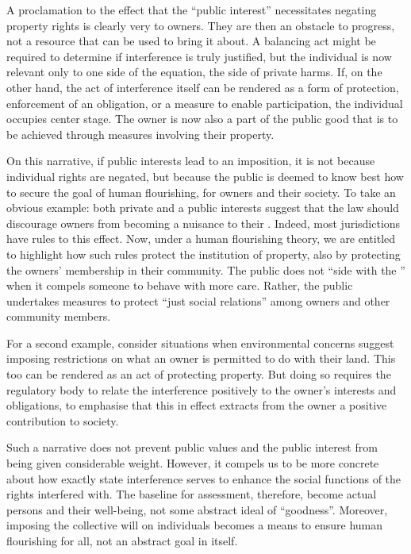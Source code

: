{A proclamation to the effect that the ``public interest'' necessitates negating property rights is clearly very  to owners. They are then an obstacle to progress, not a resource that can be used to bring it about. A balancing act might be required to determine if interference is truly justified, but the individual is now relevant only to one side of the equation, the side of private harms. If, on the other hand, the act of interference itself can be rendered as a form of protection, enforcement of an obligation, or a measure to enable participation, the individual occupies center stage. The owner is now also a part of the public good that is to be achieved through measures involving their property.

On this narrative, if public interests lead to an imposition, it is not because individual rights are negated, but because the public is deemed to know best how to secure the goal of human flourishing, for owners and their society. To take an obvious example: both private and a public interests suggest that the law should discourage owners from becoming a nuisance to their . Indeed, most jurisdictions have rules to this effect. Now, under a human flourishing theory, we are entitled to highlight how such rules protect the institution of property, also by protecting the owners' membership in their community. The public does not ``side with the '' when it compels someone to behave with more care. Rather, the public undertakes measures to protect ``just social relations'' among owners and other community members.

For a second example, consider situations when environmental concerns suggest imposing restrictions on what an owner is permitted to do with their land. This too can be rendered as an act of protecting property. But doing so requires the regulatory body to relate the interference positively to the owner's interests and obligations, to emphasise that this in effect extracts from the owner a positive contribution to society.

Such a narrative does not prevent public values and the public interest from being given considerable weight. However, it compels us to be more concrete about how exactly state interference serves to enhance the social functions of the rights interfered with. The baseline for assessment, therefore, become actual persons and their well-being, not some abstract ideal of ``goodness''. Moreover, imposing the collective will on individuals becomes a means to ensure human flourishing for all, not an abstract goal in itself.

}
